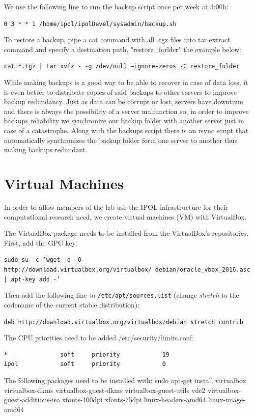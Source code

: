\documentclass[a4paper,12pt]{article}
\begin{document}
We use the following line to run the backup script once per week at 3:00h:

{\tt 0 3 * * 1 /home/ipol/ipolDevel/sysadmin/backup.sh}


To restore a backup, pipe a cat command with all .tgz files into tar extract command and specify a destination path, "restore\_forlder" the example below:

{\tt cat *.tgz | tar xvfz - -g /dev/null --ignore-zeros -C restore\_folder}


While making backups is a good way to be able to recover in case of data loss, it is even better to distribute copies of said backups to other servers to improve backup redundancy. Just as data can be corrupt or lost, servers have downtime and there is always the possibility of a server malfunction so, in order to improve backups reliability we synchronize our backup folder with another server just in case of a catastrophe. Along with the backups script there is an rsync script that automatically synchronizes the backup folder form one server to another thus making backups redundant.


\section{Virtual Machines}
\label{sec:virtual_machines}
In order to allow members of the lab use the IPOL infrastructure for their computational research need, we create virtual machines (VM) with VirtualBox.

The VirtualBox package needs to be installed from the VirtualBox's repositories. First, add the GPG key:

{\tt sudo su -c 'wget -q -O- http://download.virtualbox.org/virtualbox/\
debian/oracle\_vbox\_2016.asc | apt-key add -'}

Then add the following line to {\tt /etc/apt/sources.list} (change \emph{stretch} to the codename of the current stable distribution):

{\tt deb http://download.virtualbox.org/virtualbox/debian stretch contrib}

The CPU priorities need to be added /etc/security/limits.conf:
\begin{verbatim}
*               soft     priority            19
ipol            soft     priority            0
\end{verbatim}


The following packages need to be installed with: sudo apt-get install virtualbox virtualbox-dkms virtualbox-guest-dkms virtualbox-guest-utils vde2 virtualbox-guest-additions-iso xfonts-100dpi xfonts-75dpi linux-headers-amd64 linux-image-amd64
\end{document}
